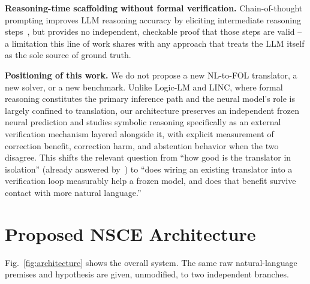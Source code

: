 \documentclass[conference]{IEEEtran}
\begin{document}
\textbf{Reasoning-time scaffolding without formal verification.} Chain-of-thought prompting improves LLM reasoning accuracy by eliciting intermediate reasoning steps~\cite{wei2022cot}, but provides no independent, checkable proof that those steps are valid -- a limitation this line of work shares with any approach that treats the LLM itself as the sole source of ground truth.

\textbf{Positioning of this work.} We do not propose a new NL-to-FOL translator, a new solver, or a new benchmark. Unlike Logic-LM and LINC, where formal reasoning constitutes the primary inference path and the neural model's role is largely confined to translation, our architecture preserves an independent frozen neural prediction and studies symbolic reasoning specifically as an external verification mechanism layered alongside it, with explicit measurement of correction benefit, correction harm, and abstention behavior when the two disagree. This shifts the relevant question from ``how good is the translator in isolation'' (already answered by~\cite{putra2026nl2logic}) to ``does wiring an existing translator into a verification loop measurably help a frozen model, and does that benefit survive contact with more natural language.''

\section{Proposed NSCE Architecture}
\label{sec:architecture}

Fig.~\ref{fig:architecture} shows the overall system. The same raw natural-language premises and hypothesis are given, unmodified, to two independent branches.
\end{document}
